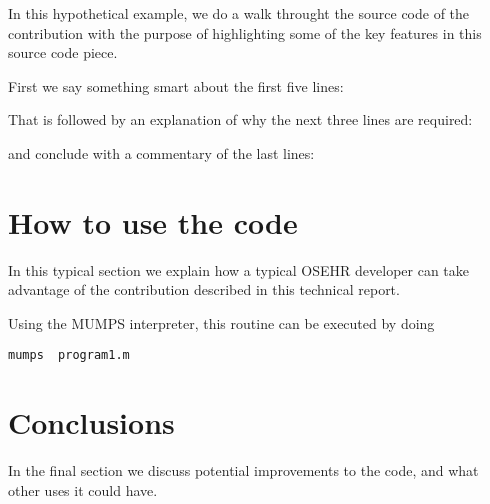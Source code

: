 \documentclass{InsightArticle}
\newcommand{\lstlistingwithnumber}[3]{
\begin{center}

\end{center}
}
\begin{document}
In this hypothetical example, we do a walk throught the source code of the
contribution with the purpose of highlighting some of the key features in this
source code piece.

First we say something smart about the first five lines:

\lstlistingwithnumber{1}{5}{program1.m}

That is followed by an explanation of why the next three lines are required:

\lstlistingwithnumber{6}{9}{program1.m}

and conclude with a commentary of the last lines:

\lstlistingwithnumber{10}{14}{program1.m}



\section{How to use the code}

In this typical section we explain how a typical OSEHR developer can take
advantage of the contribution described in this technical report.

Using the MUMPS interpreter, this routine can be executed by doing

\begin{verbatim}
mumps  program1.m
\end{verbatim}


\section{Conclusions}

In the final section we discuss potential improvements to the code, and what
other uses it could have.


%
%



\end{document}
